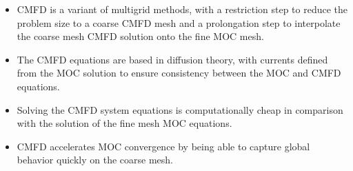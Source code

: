 \newpage
\vfill
\begin{highlightsbox}[frametitle=Highlights]
	\begin{itemize}
		\item CMFD is a variant of multigrid methods, with a restriction step to reduce the problem size to a coarse CMFD mesh and a prolongation step to interpolate the coarse mesh CMFD solution onto the fine MOC mesh.
		\item The CMFD equations are based in diffusion theory, with currents defined from the MOC solution to ensure consistency between the MOC and CMFD equations.
		\item Solving the CMFD system equations is computationally cheap in comparison with the solution of the fine mesh MOC equations.
		\item CMFD accelerates MOC convergence by being able to capture global behavior quickly on the coarse mesh.
	\end{itemize}
\end{highlightsbox}
\vfill